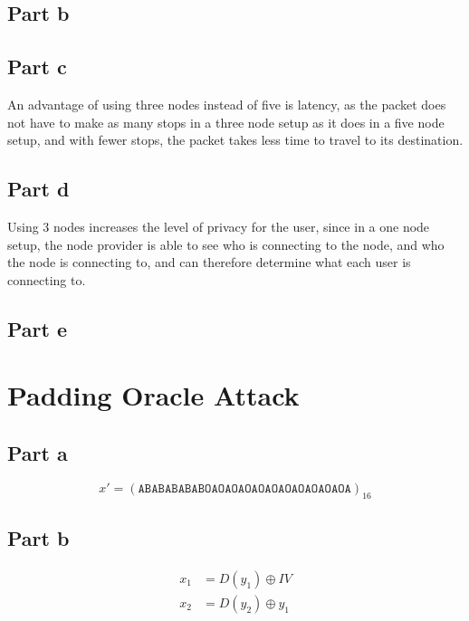 \documentclass[12pt,a4paper]{article}
\begin{document}
\subsection{Part b}


\subsection{Part c}
An advantage of using three nodes instead of five is latency, as the packet does not have to make as many stops in a three node setup as it does in a five node setup, and with fewer stops, the packet takes less time to travel to its destination.

\subsection{Part d}
Using 3 nodes increases the level of privacy for the user, since in a one node setup, the node provider is able to see who is connecting to the node, and who the node is connecting to, and can therefore determine what each user is connecting to.

\subsection{Part e}


\section{Padding Oracle Attack}
\subsection{Part a}
\[
  x' = (\mathtt{ABABABABABOAOAOAOAOAOAOAOAOAOAOA})_{16}
\]

\subsection{Part b}
\begin{align*}
  x_1 &= D(y_1) \oplus IV \\
  x_2 &= D(y_2) \oplus y_1
\end{align*}
\end{document}

